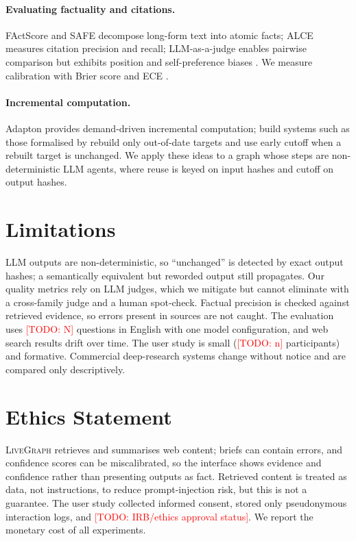 \documentclass[11pt]{article}
\newcommand{\todo}[1]{\textcolor{red}{[TODO: #1]}}
\newcommand{\sys}{\textsc{LiveGraph}}
\begin{document}
\paragraph{Evaluating factuality and citations.} FActScore \citep{min2023factscore} and SAFE
\citep{wei2024longform} decompose long-form text into atomic facts; ALCE \citep{gao2023alce} measures
citation precision and recall; LLM-as-a-judge \citep{zheng2023judging} enables pairwise comparison but
exhibits position and self-preference biases \citep{panickssery2024selfpref}. We measure calibration with
Brier score and ECE \citep{brier1950,naeini2015ece,guo2017calibration}.

\paragraph{Incremental computation.} Adapton \citep{hammer2014adapton} provides demand-driven
incremental computation; build systems such as those formalised by \citet{mokhov2018buildsystems} rebuild
only out-of-date targets and use early cutoff when a rebuilt target is unchanged. We apply these ideas to
a graph whose steps are non-deterministic LLM agents, where reuse is keyed on input hashes and cutoff on
output hashes.

\section*{Limitations}
LLM outputs are non-deterministic, so ``unchanged'' is detected by exact output hashes; a semantically
equivalent but reworded output still propagates. Our quality metrics rely on LLM judges, which we mitigate
but cannot eliminate with a cross-family judge and a human spot-check. Factual precision is checked against
retrieved evidence, so errors present in sources are not caught. The evaluation uses \todo{N} questions in
English with one model configuration, and web search results drift over time. The user study is small
(\todo{n} participants) and formative. Commercial deep-research systems change without notice and are
compared only descriptively.

\section*{Ethics Statement}
\sys{} retrieves and summarises web content; briefs can contain errors, and confidence scores can be
miscalibrated, so the interface shows evidence and confidence rather than presenting outputs as fact.
Retrieved content is treated as data, not instructions, to reduce prompt-injection risk, but this is not a
guarantee. The user study collected informed consent, stored only pseudonymous interaction logs, and
\todo{IRB/ethics approval status}. We report the monetary cost of all experiments.


\end{document}
